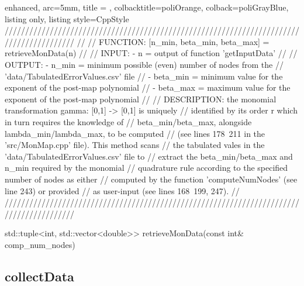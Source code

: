 \documentclass[a4paper, twosided]{book}
\begin{document}
\begin{tcblisting}{enhanced,
                   arc=5mm,
                   title = \color{black}{\large \ttfamily DatIo.cpp/retrieveMonbData},
                   colbacktitle=poliOrange,
                   colback=poliGrayBlue,
                   listing only,
                   listing style=CppStyle}
/////////////////////////////////////////////////////////////////////////////////////////
//
//       FUNCTION: [n_min, {beta_min, beta_max}] = retrieveMonData(n)
//                
//        INPUT: - n = output of function 'getInputData'
//
//       OUTPUT: - n_min = minimum possible (even) number of nodes from the 
//                         'data/TabulatedErrorValues.csv' file
//               - beta_min = minimum value for the exponent of the post-map polynomial
//               - beta_max = maximum value for the exponent of the post-map polynomial
//
//    DESCRIPTION: the monomial transformation gamma: [0,1] -> [0,1] is uniquely 
//                 identified by its order r which in turn requires the knowledge of
//                 beta_min/beta_max, alongside lambda_min/lambda_max, to be computed
//                 (see lines 178~211 in the 'src/MonMap.cpp' file). This method scans
//                 the tabulated vales in the 'data/TabulatedErrorValues.csv' file to
//                 extract the beta_min/beta_max and n_min required by the monomial
//                 quadrature rule according to the specified number of nodes as either
//                 computed by the function 'computeNumNodes' (see line 243) or provided
//                 as user-input (see lines 168~199, 247).
//
/////////////////////////////////////////////////////////////////////////////////////////

std::tuple<int, std::vector<double>> retrieveMonData(const int& comp_num_nodes)
\end{tcblisting}

\subsection[collectData]{\changefont collectData}\label{SubSec4.2.4}
\end{document}
